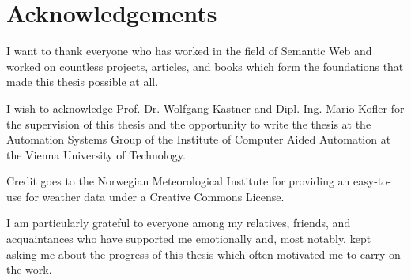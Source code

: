 \chapter*{Acknowledgements}

I want to thank everyone who has worked in the field of Semantic Web and worked on countless projects, articles, and books which form the foundations that made this thesis possible at all.

I wish to acknowledge Prof. Dr. Wolfgang Kastner and Dipl.-Ing. Mario Kofler for the supervision of this thesis and the opportunity to write the thesis at the Automation Systems Group of the Institute of Computer Aided Automation at the Vienna University of Technology.

Credit goes to the Norwegian Meteorological Institute for providing an easy-to-use  for weather data under a Creative Commons License.

I am particularly grateful to everyone among my relatives, friends, and acquaintances who have supported me emotionally and, most notably, kept asking me about the progress of this thesis which often motivated me to carry on the work.
